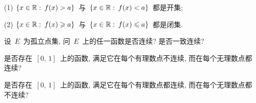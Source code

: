 \begin{problemset}
\noindent (1) $\{x \in \mathbb{R}: \: f(x) > a\}$~与~$\{x \in \mathbb{R}: \: f(x) < a\}$~都是开集;

\noindent (2) $\{x \in \mathbb{R}: \: f(x) \geqslant a\}$~与~$\{x \in \mathbb{R}: \: f(x) \leqslant a\}$~都是闭集.

\item 设~$E$~为孤立点集, 问~$E$~上的任一函数是否连续? 是否一致连续?

\item 是否存在~$[0,\,1]$~上的函数, 满足它在每个有理数点不连续, 而在每个无理数点都连续?

\item 是否存在~$[0,\,1]$~上的函数, 满足它在每个有理数点都连续, 而在每个无理数点都不连续?
\end{problemset}
